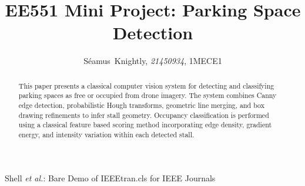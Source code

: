 \documentclass[9pt,journal]{IEEEtran}
\begin{document}
	\title{EE551 Mini Project: Parking Space Detection}
	
	
	\author{Séamus~Knightly, \textit{21450934}, 1MECE1%
	}
	
	
	
	
	{Shell \MakeLowercase{\textit{et al.}}: Bare Demo of IEEEtran.cls for IEEE Journals}
	
	
	
	
	
	
	
	
	
	
	
	\maketitle
	
	\begin{abstract}
		This paper presents a classical computer vision system for detecting and classifying parking spaces as free or occupied from drone imagery. The system combines Canny edge detection, probabilistic Hough transforms, geometric line merging, and box drawing refinements to infer stall geometry. Occupancy classification is performed using a classical feature based scoring method incorporating edge density, gradient energy, and intensity variation within each detected stall.
	\end{abstract}

	\IEEEpeerreviewmaketitle
	
\end{document}
